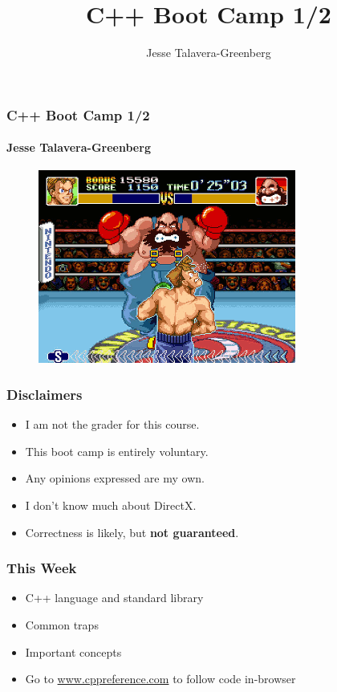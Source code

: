 \documentclass[glossy]{beamer}
\title{C++ Boot Camp 1/2}
\author{Jesse Talavera-Greenberg}
\date{}
\begin{document}
\begin{frame}[fragile=singleslide]
  \frametitle{C++ Boot Camp 1/2}
  \framesubtitle{Jesse Talavera-Greenberg}
  \begin{figure}
    \includegraphics[width=.75\columnwidth]{super-punch-out}
    \centering
  \end{figure}
\end{frame}


\begin{frame}[fragile=singleslide]
  \frametitle{Disclaimers}
  \begin{itemize}
    \item I am not the grader for this course.
    \item This boot camp is entirely voluntary.
    \item Any opinions expressed are my own.
    \item I don't know much about DirectX.
    \item Correctness is likely, but \textbf{not guaranteed}.
  \end{itemize}
\end{frame}


\begin{frame}[fragile=singleslide]
  \frametitle{This Week}
  \begin{itemize}
    \item C++ language and standard library
    \item Common traps
    \item Important concepts
    \item Go to \href{www.cppreference.com}{www.cppreference.com} to follow code in-browser
  \end{itemize}
\end{frame}
\end{document}
